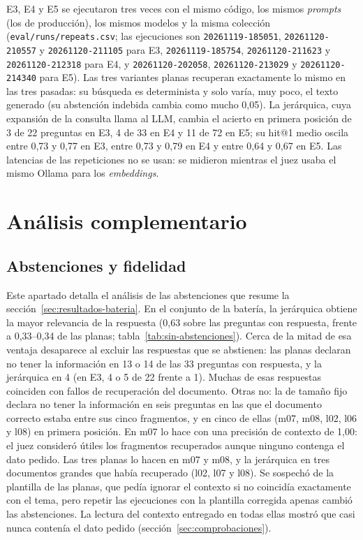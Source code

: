 E3, E4 y E5 se ejecutaron tres veces con el mismo código, los mismos \emph{prompts} (los de producción), los mismos modelos y la misma colección (\texttt{eval/runs/repeats.csv}; las ejecuciones son \texttt{20261119-185051}, \texttt{20261120-210557} y \texttt{20261120-211105} para E3, \texttt{20261119-185754}, \texttt{20261120-211623} y \texttt{20261120-212318} para E4, y \texttt{20261120-202058}, \texttt{20261120-213029} y \texttt{20261120-214340} para E5). Las tres variantes planas recuperan exactamente lo mismo en las tres pasadas: su búsqueda es determinista y solo varía, muy poco, el texto generado (su abstención indebida cambia como mucho 0,05). La jerárquica, cuya expansión de la consulta llama al LLM, cambia el acierto en primera posición de 3 de 22 preguntas en E3, 4 de 33 en E4 y 11 de 72 en E5; su hit@1 medio oscila entre 0,73 y 0,77 en E3, entre 0,73 y 0,79 en E4 y entre 0,64 y 0,67 en E5. Las latencias de las repeticiones no se usan: se midieron mientras el juez usaba el mismo Ollama para los \emph{embeddings}.

\section{Análisis complementario}
\label{sec:analisis-complementario}

\subsection{Abstenciones y fidelidad}

Este apartado detalla el análisis de las abstenciones que resume la sección~\ref{sec:resultados-bateria}. En el conjunto de la batería, la jerárquica obtiene la mayor relevancia de la respuesta (0,63 sobre las preguntas con respuesta, frente a 0,33--0,34 de las planas; tabla~\ref{tab:sin-abstenciones}). Cerca de la mitad de esa ventaja desaparece al excluir las respuestas que se abstienen: las planas declaran no tener la información en 13 o 14 de las 33 preguntas con respuesta, y la jerárquica en 4 (en E3, 4 o 5 de 22 frente a 1). Muchas de esas respuestas coinciden con fallos de recuperación del documento. Otras no: la de tamaño fijo declara no tener la información en seis preguntas en las que el documento correcto estaba entre sus cinco fragmentos, y en cinco de ellas (m07, m08, l02, l06 y l08) en primera posición. En m07 lo hace con una precisión de contexto de 1,00: el juez consideró útiles los fragmentos recuperados aunque ninguno contenga el dato pedido. Las tres planas lo hacen en m07 y m08, y la jerárquica en tres documentos grandes que había recuperado (l02, l07 y l08). Se sospechó de la plantilla de las planas, que pedía ignorar el contexto si no coincidía exactamente con el tema, pero repetir las ejecuciones con la plantilla corregida apenas cambió las abstenciones. La lectura del contexto entregado en todas ellas mostró que casi nunca contenía el dato pedido (sección~\ref{sec:comprobaciones}).

